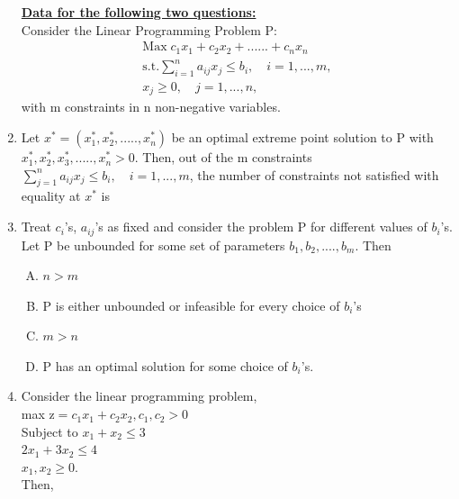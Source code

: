 \documentclass[journal,12pt,twocolumn]{IEEEtran}
\begin{document}
\begin{enumerate}
\textbf{\underline{Data for the following two questions:}} \\
\medskip
Consider the Linear Programming Problem P: 
\begin{align*}
\text{Max} \; c_1x_1 \! + \! c_2x_2 \! + \! ......+ \! c_nx_n \\
\text{s.t.} \sum_{i=1}^{n} a_{ij}x_j \! \leqslant \! b_i, \quad i=1,...,m, \\
x_j \! \geqslant \! 0, \quad j=1,...,n, 
\end{align*}
with m constraints in n non-negative variables.\\

\item Let $x^* \! = \! (x_1^*, \! x_2^*, \! .....,x_n^*)$ be an optimal extreme point solution to P with $x_1^*, \! x_2^*, \! x_3^*,.....,x_n^* \! > \! 0$. Then, out of the m constraints $\sum_{j=1}^{n} a_{ij}x_j \! \leqslant \! b_i, \quad i=1,...,m$, the number of constraints not satisfied with equality at $x^*$ is 

\begin{enumerate}[(A)]
\end{enumerate}

\item Treat $c_i$'s, $a_{ij}$'s as fixed and consider the problem P for different values of $b_i$'s. Let P be unbounded for some set of parameters $b_1, \! b_2,...., \! b_m$. Then 
\begin{enumerate}[(A)]
\setlength\itemsep{1em} 

\item $n \! > \! m$
\item P is either unbounded or infeasible for every choice of $b_i$'s
\item $m \! > \! n$
\item P has an optimal solution for some choice of $b_i$'s.
\end{enumerate} 

\item Consider the linear programming problem, \\
max $\text{z} \! = \! c_1x_1 \! + \! c_2x_2, \! c_1, \! c_2 \! > 0$ \\
Subject to $x_1 \! + \! x_2 \! \leqslant \! 3$ \\ \medskip
$2x_1 \! + \! 3x_2 \! \leqslant \! 4$ \\
$x_1, \! x_2 \! \geqslant \! 0$. \\
Then,


\end{enumerate}
\end{document}

